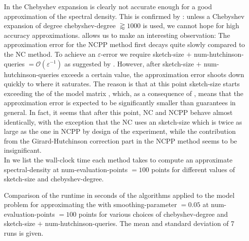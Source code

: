 In  the
Chebyshev expansion is clearly not accurate enough for a good approximation
of the spectral density. This is confirmed by :
unless a Chebyshev expansion of degree \gls{chebyshev-degree} $\gtrapprox 1000$ is used,
we cannot hope for high accuracy approximations.
 allows us to
make an interesting observation: The approximation error for the \gls{NCPP} method
first decays quite slowly compared to the \gls{NC} method.
To achieve an $\varepsilon$-error we require \gls{sketch-size} $+$ \gls{num-hutchinson-queries} $=\mathcal{O}(\varepsilon^{-1})$
as suggested by .
However, after \gls{sketch-size} $+$ \gls{num-hutchinson-queries}
exceeds a certain value, the approximation error shoots down quickly to where it
saturates. The reason is that at this point \gls{sketch-size} starts exceeding
the  of the model matrix ,
which, as a consequence of
, means that the approximation error is
expected to be significantly smaller than 
guarantees in general. In fact, it seems that after this point, \gls{NC} and \gls{NCPP}
behave almost identically, with the exception that the \gls{NC} uses 
an \gls{sketch-size} which is twice as large as the one in \gls{NCPP} by design
of the experiment, while the contribution from the Girard-Hutchinson correction part
in the \gls{NCPP} method  seems to be
insignificant.\\

In  we list the wall-clock time each method
takes to compute an approximate \gls{spectral-density} at \gls{num-evaluation-points} $=100$ points
for different values of \gls{sketch-size} and \gls{chebyshev-degree}.\\

\begin{table}[ht]
    \caption{Comparison of the runtime in seconds of the algorithms applied to the model problem
        for approximating the  with 
        \gls{smoothing-parameter} $=0.05$ at \gls{num-evaluation-points} $=100$
        points for various choices of \gls{chebyshev-degree} and \gls{sketch-size} $+$ \gls{num-hutchinson-queries}.
        The mean and standard deviation of 7 runs is given.}
    \label{tab:5-experiments-timing-DGC}
    
\end{table}

